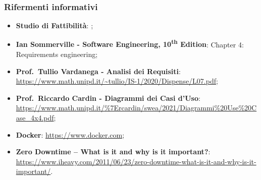    \subsubsection{Rifermenti informativi}
    \begin{itemize}
        \item \textbf{Studio di Fattibilità}: ;
        \item \textbf{Ian Sommerville - Software Engineering, 10\textsuperscript{th} Edition}: Chapter 4: Requirements engineering;
        \item \textbf{Prof.\ Tullio Vardanega - Analisi dei Requisiti}: \url{https://www.math.unipd.it/~tullio/IS-1/2020/Dispense/L07.pdf};
        \item \textbf{Prof.\ Riccardo Cardin - Diagrammi dei Casi d'Uso}: \url{https://www.math.unipd.it/\%7Ercardin/swea/2021/Diagrammi\%20Use\%20Case\_4x4.pdf};
        \item \textbf{Docker}: \url{https://www.docker.com};
        \item \textbf{Zero Downtime – What is it and why is it important?}: \url{https://www.iheavy.com/2011/06/23/zero-downtime-what-is-it-and-why-is-it-important/}.
    \end{itemize}
